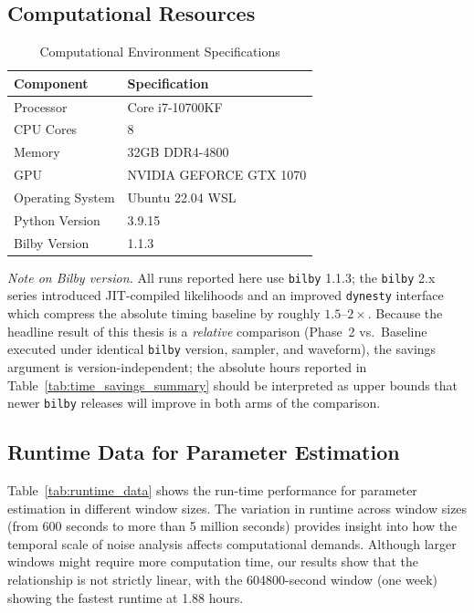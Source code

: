 \documentclass[12pt]{article}
\begin{document}
\subsection{Computational Resources}
\begin{table}[H]
\centering
\caption{Computational Environment Specifications}
\label{tab:compute_specs}
\begin{tabular}{ll}
\hline
\textbf{Component} & \textbf{Specification} \\
\hline
Processor &  Core i7-10700KF \\
CPU Cores &  8  \\
Memory & 32GB DDR4-4800 \\
GPU & NVIDIA GEFORCE GTX 1070 \\
Operating System & Ubuntu 22.04 WSL \\
Python Version & 3.9.15 \\
Bilby Version & 1.1.3 \\
\hline
\end{tabular}
\end{table}

\noindent\emph{Note on Bilby version.} All runs reported here use \texttt{bilby} 1.1.3; the \texttt{bilby} 2.x series introduced JIT-compiled likelihoods and an improved \texttt{dynesty} interface \cite{Bilby-MCMC} which compress the absolute timing baseline by roughly $1.5$--$2\times$. Because the headline result of this thesis is a \emph{relative} comparison (Phase~2 vs.\ Baseline executed under identical \texttt{bilby} version, sampler, and waveform), the savings argument is version-independent; the absolute hours reported in Table~\ref{tab:time_savings_summary} should be interpreted as upper bounds that newer \texttt{bilby} releases will improve in both arms of the comparison.

\subsection{Runtime Data for Parameter Estimation}
\label{appendix:runtime}

Table~\ref{tab:runtime_data} shows the run-time performance for parameter estimation in different window sizes. The variation in runtime across window sizes (from 600 seconds to more than 5 million seconds) provides insight into how the temporal scale of noise analysis affects computational demands. Although larger windows might require more computation time, our results show that the relationship is not strictly linear, with the 604800-second window (one week) showing the fastest runtime at 1.88 hours.
\end{document}
